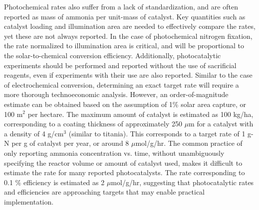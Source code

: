 Photochemical rates also suffer from a lack of standardization, and are often reported as mass of ammonia per unit-mass of catalyst. Key quantities such as catalyst loading and illumination area are needed to effectively compare the rates, yet these are not always reported. In the case of photochemical nitrogen fixation, the rate normalized to illumination area is critical, and will be proportional to the solar-to-chemical conversion efficiency. Additionally, photocatalytic experiments should be performed and reported without the use of sacrificial reagents, even if experiments with their use are also reported. Similar to the case of electrochemical conversion, determining an exact target rate will require a more thorough technoeconomic analysis. However, an order-of-magnitude estimate can be obtained based on the assumption of 1\% solar area capture, or 100 m$^2$ per hectare. The maximum amount of catalyst is estimated as 100 kg/ha, corresponding to a coating thickness of approximately 250 $\mu$m for a catalyst with a density of 4 g/cm$^3$ (similar to titania). This corresponds to a target rate of 1 g-N per g of catalyst per year, or around 8 $\mu$mol/g/hr. The common practice of only reporting ammonia concentration vs. time, without unambiguously specifying the reactor volume or amount of catalyst used, makes it difficult to estimate the rate for many reported photocatalysts. The rate corresponding to 0.1 \% efficiency is estimated as 2 $\mu$mol/g/hr, suggesting that photocatalytic rates and efficiencies are approaching targets that may enable practical implementation.




